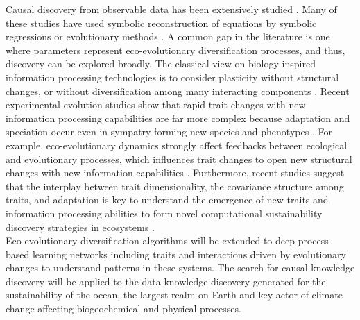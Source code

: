 \documentclass[12pt,a4paper]{article}
\begin{document}
Causal discovery from observable data has been extensively studied \citep{Rackauckas2020}. Many of these studies have used symbolic reconstruction of equations by symbolic regressions or evolutionary methods \citep{Koza1992, quade2016prediction, tanevski2020combinatorial}. A common gap in the literature is one where parameters represent eco-evolutionary diversification processes, and thus, discovery can be explored broadly. The classical view on biology-inspired information processing technologies is to consider plasticity without structural changes, or without diversification among many interacting components \citep{DARWISH2018231}. Recent experimental evolution studies show that rapid trait changes with new information processing capabilities are far more complex because adaptation and speciation occur even in sympatry forming new species and phenotypes \citep{Seehausen2014}. For example, eco-evolutionary dynamics strongly affect feedbacks between ecological and evolutionary processes, which influences trait changes to open new structural changes with new information capabilities \citep{Govaertetal2019}. Furthermore, recent studies suggest that the interplay between trait dimensionality, the covariance structure among traits, and adaptation is key to understand the emergence of new traits and information processing abilities to form novel computational sustainability discovery strategies in ecosystems \cite{zora172044}.\\

Eco-evolutionary diversification algorithms will be extended to deep process-based learning networks including traits and interactions driven by evolutionary changes to understand patterns in these systems. The search for causal knowledge discovery will be applied to the data knowledge discovery generated for the sustainability of the ocean, the largest realm on Earth and key actor of climate change affecting biogeochemical and physical processes. 
\end{document}
